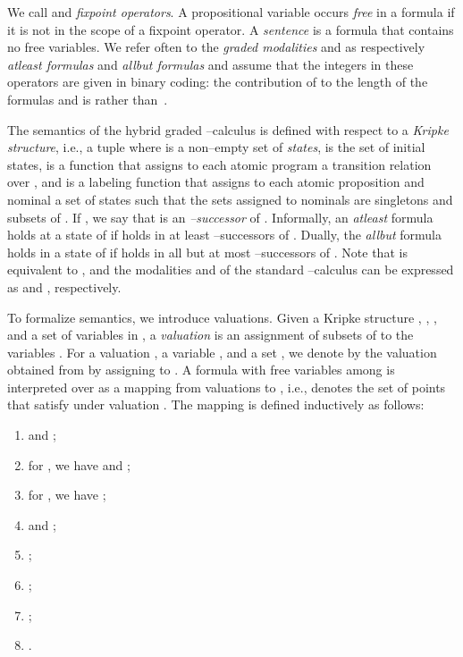 \documentclass{LMCS}
\theoremstyle{plain}
\begin{document}
We call  and  \emph{fixpoint operators}. A propositional variable 
occurs \emph{free} in a formula if it is not in the scope of a fixpoint
operator. A \emph{sentence} is a formula that contains no free variables. We
refer often to the \emph{graded modalities}  and
 as respectively \emph{atleast formulas} and
\emph{allbut formulas} and assume that the integers in these operators are
given in binary coding: the contribution of  to the length of the formulas
 and  is 
rather than~.

The semantics of the hybrid graded --calculus is defined with respect to a
\emph{Kripke structure}, i.e., a tuple  where  is a
non--empty set of \emph{states},  is the set of initial
states,  is a function that
assigns to each atomic program a transition relation over , and  is a labeling function that assigns to each
atomic proposition and nominal a set of states such that the sets assigned to
nominals are singletons and subsets of . If , we say
that  is an \emph{--successor} of . Informally, an
\emph{atleast} formula  holds at a state  of  if
 holds in at least  --successors of . Dually, the
\emph{allbut} formula  holds in a state  of  if
 holds in all but at most  --successors of . Note that
 is equivalent to , and
the modalities  and  of the
standard --calculus can be expressed as  and
, respectively.

To formalize semantics, we introduce valuations. Given a Kripke
structure , , ,  and a set
 of variables in , a
\emph{valuation}  is
an assignment of subsets of  to the variables .  For a valuation , a variable , and a set , we denote by  the valuation
obtained from  by assigning  to . A formula 
with free variables among  is interpreted over
 as a mapping  from valuations to , i.e.,
 denotes the set of points that satisfy
 under valuation . The mapping  is
defined inductively as follows:
\begin{enumerate}[]
\item
 and ;

\item
for , we have 
and ;

\item
for , we have ;

\item
 and ;

\item
;

\item
;

\item
;

\item
.
\end{enumerate}
\end{document}
